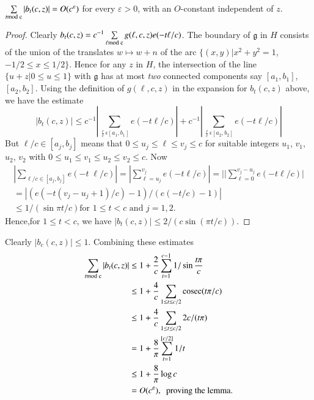 \setcounter{sublemma}{4}
\begin{sublemma}\label{c1:lem-1.1.5}
$\sum\limits_{t\rm{mod} \; c}|b_{t}(c,z)|=O(c^{\varepsilon})$ for every
  $\varepsilon>0$, with an $O$-constant independent of $z$.
\end{sublemma}

\begin{proof}
Clearly $b_{t}(c,z)=c^{-1}\sum\limits_{\ell\rm{mod} \;
  c}g(\ell,c,z)e(-t\ell/c)$. The boundary of $\mathfrak{g}$ in $H$
consists of the union of the translates $w\mapsto w+n$ of the arc
$\{(x,y)|x^{2}+y^{2}=1$, $-1/2\leq x\leq 1/2\}$. Hence for any $z$ in
$H$, the intersection of the line $\{u+z|0\leq u\leq 1\}$ with
$\mathfrak{g}$ has at most {\em two} connected components say
$[a_{1},b_{1}]$, $[a_{2},b_{2}]$. Using the definition of
$g(\ell,c,z)$ in the expansion for $b_{t}(c,z)$ above, we have the
estimate
$$
|b_{t}(c,z)|\leq c^{-1}|\sum\limits_{\frac{\ell}{c}\epsilon
  [a_{1},b_{1}]}e(-t\ell/c)|+c^{-1}|\sum_{\frac{\ell}{c}\epsilon[a_{2},b_{2}]}e(-t\ell/c)|
$$
But $\ell/c\in [a_{j},b_{j}]$ means that $0\leq u_{j}\leq \ell \leq
v_{j}\leq c$ for suitable integers $u_{1}$, $v_{1}$, $u_{2}$, $v_{2}$
with $0\leq u_{1}\leq v_{1}\leq u_{2}\leq v_{2}\leq c$. Now
\begin{gather*}
|\sum_{\ell/c\in[a_{j},b_{j}]} e(-t \; \ell/c)| =
|\sum^{v_{j}}_{\ell=u_{j}}e(-t\ell/c)| =
||\sum^{v_{j}-u_{j}}_{\ell=0}e(-t\ell/c)|\\  
=|(e(-t(v_{j}-u_{j}+1)/c)-1)/(e(-t/c)-1)|\\
\leq 1/(\sin \pi t/c)\text{
  \ for \ } 1\leq t<c\text{ \  and \ } j=1,2.
\end{gather*}
Hence,\pageoriginale for $1\leq t<c$, we have $|b_{t}(c,z)|\leq
2/(c\sin (\pi t/c))$.
\end{proof}

Clearly $|b_{c}(c,z)|\leq 1$. Combining these estimates
\begin{align*}
\sum_{t\rm{mod} \; c}|b_{t}(c,z)| &\leq 1+\frac{2}{c}\sum^{c-1}_{t=1}1/\sin
\frac{t\pi}{c}\\
&\leq 1+\frac{4}{c}\sum_{1\leq t\leq c/2}\operatorname{cosec} (t\pi /c)\\
&\leq 1+\frac{4}{c}\sum_{1\leq t\leq c/2}2c/(t\pi)\\
&= 1+\frac{8}{\pi}\sum^{[c/2]}_{t=1}1/t\\
&\leq 1+\frac{8}{\pi}\log c\\
&= O(c^{\varepsilon}), \text{ \  proving the lemma.}
\end{align*}

